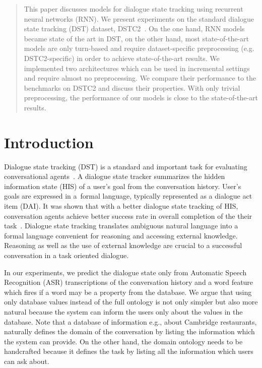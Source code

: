 \documentclass{itatnew}
\begin{document}
\begin{abstract}
This paper discusses models for dialogue state tracking using recurrent neural networks (RNN).
    We present experiments on the standard dialogue state tracking (DST) dataset, DSTC2~\cite{henderson2014second}.
On the one hand, RNN models became state of the art in DST,
on the other hand, most state-of-the-art models are only turn-based and require dataset-specific preprocessing (e.g. DSTC2-specific) in order to achieve state-of-the-art results.
We implemented two architectures which can be used in incremental settings and require almost no preprocessing.
We compare their performance to the benchmarks on DSTC2 and discuss their properties.
With only trivial preprocessing, the performance of our models is close to the state-of-the-art results.
\end{abstract}
%
\section{Introduction}
%
Dialogue state tracking (DST) is a standard and important task for evaluating conversational agents~\cite{williams2013dialog, henderson2014second, henderson2014third}.
A dialogue state tracker summarizes the hidden information state (HIS)\cite{young2010hidden} of a user's goal from the conversation history.
User's goals are expressed in a~formal language, typically represented as a dialogue act item (DAI). 
It was shown that with a better dialogue state tracking of HIS, conversation agents achieve better success rate in overall completion of the their task~\cite{jurvcivcek2012reinforcement}.
Dialogue state tracking translates ambiguous natural language into a formal language convenient for reasoning and accessing external knowledge. Reasoning as well as the use of external knowledge are crucial to a successful conversation in a task oriented dialogue.


In our experiments, we predict the dialogue state only from Automatic Speech Recognition (ASR) transcriptions of the conversation history and a word feature which fires if a word may be a property from the database.
We argue that using only database values instead of the full ontology is not only simpler but also more natural because the system can inform the users only about the values in the database.
Note that a database of information e.g., about Cambridge restaurants, naturally defines the domain of the conversation by listing the information which the system can provide.
On the other hand, the domain ontology needs to be handcrafted because it defines the task by listing all the information which users can ask about.
\end{document}

